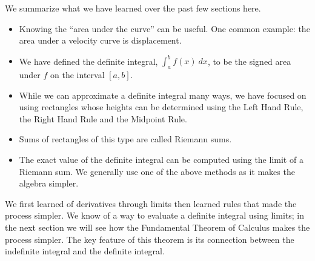 We summarize what we have learned over the past few sections here.
\begin{itemize}
\item		Knowing the ``area under the curve'' can be useful. One common example: the area under a velocity curve is displacement.
\item		We have defined the definite integral, $\int_a^b f(x)\ dx$, to be the signed area under $f$ on the interval $[a,b]$. 
\item		While we can approximate a definite integral many ways, we have focused on using rectangles whose heights can be determined using the Left Hand Rule, the Right Hand Rule and the Midpoint Rule. 
\item		Sums of rectangles of this type are called Riemann sums.
\item		The exact value of the definite integral can be computed using the limit of a Riemann sum. We generally use one of the above methods as it makes the algebra simpler.
\end{itemize}

We first learned of derivatives through limits then learned rules that made the process simpler. We know of a way to evaluate a definite integral using limits; in the next section we will see how the Fundamental Theorem of Calculus makes the process simpler. The key feature of this theorem is its connection between the indefinite integral and the definite integral.

